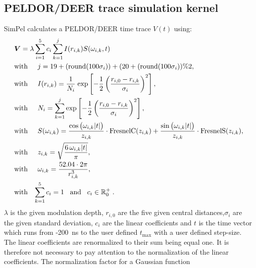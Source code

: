 \documentclass[pdftex,bezier,german,a4,twoside, headexclude,12pt,nochapterprefix, titlepage]{extarticle}
\newcommand{\simpel}{\textsf{SimPel} }
\begin{document}
\subsection{PELDOR/DEER trace simulation kernel}
\simpel calculates a PELDOR/DEER time trace $V(t)$ using:
\begin{align}
\begin{split}
& \boldsymbol{V}=  \lambda \sum_{i=1}^5 c_i\sum_{k=1}^{j}I(r_{i,k})S(\omega_{i,k},t) \\
&\mbox{with}\hspace{0.5cm} j =  19+(\mathrm{round}(100\sigma_i)) + (20+(\mathrm{round}(100\sigma_i))\%2,\\
&\mbox{with}\hspace{0.5cm} I(r_{i,k}) =\dfrac{1}{N_{i}} \;
\mathrm{exp}\left[-\frac{1}{2}\left(\frac{r_{i,0}-r_{i,k}}{\sigma_i}\right)^2\right],\\
&\mbox{with}\hspace{0.5cm} N_{i} = \sum_{k=1}^{j}\mathrm{exp}\left[-\frac{1}{2}\left(\frac{r_{i,0}-r_{i,k}}{\sigma_i}\right)^2\right] ,\\
&\mbox{with}\hspace{0.5cm}S(\omega_{i,k}) = 
\frac{\cos{\big(\omega_{i,k}|t| \big)}}{z_{i,k}} \cdot \text{FresnelC}(z_{i,k})  + 
   \frac{\sin{\big(\omega_{i,k} |t|\big)}}{z_{i,k}} \cdot \text{FresnelS}(z_{i,k}),\\
  &\mbox{with}\hspace{0.5cm}  z_{i,k} = \sqrt{\frac{6\,\omega_{i,k} |t| }{\pi}},\\
&\mbox{with}\hspace{0.5cm} \omega_{i,k} = \dfrac{52.04\cdot 2 \pi}{r_{i,k}^3},\\ 
&\mbox{with}\hspace{0.3cm} \sum_{k=1}^{5}c_i = 1 \hspace{0.3cm}
\mbox{and}\hspace{0.3cm}c_i \in\mathbb{R}^+_0\; .
\label{PELDOR_kernel_function}
\end{split}
\end{align}
$\lambda$ is the given modulation depth, $r_{i,0}$ are the five given central distances,$\sigma_i$ are
the given standard deviation, $c_i$ are the linear coefficients and $t$ is the time vector which runs
from -200~ns to the user defined $t_{\mathrm{max}}$ with a user defined step-size. The linear coefficients are
renormalized to their sum being equal one. It is therefore not necessary to pay attention to the normalization of the linear coefficients.
The normalization factor for a Gaussian function
\end{document}
